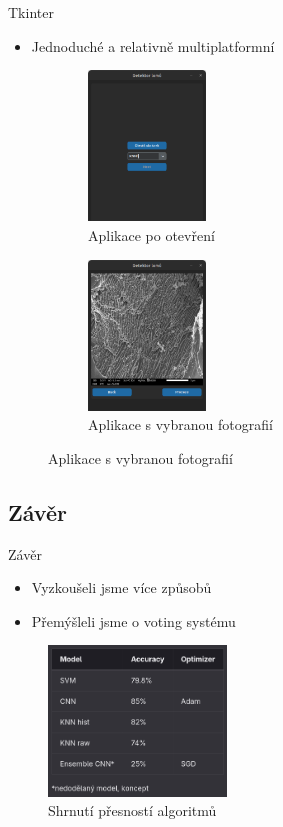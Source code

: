 \documentclass[aspectratio=169]{beamer}
\begin{document}
\begin{frame}{Tkinter}
    \begin{itemize}
        \item Jednoduché a relativně multiplatformní
    \end{itemize}
    \begin{figure}
        \centering
        \begin{subfigure}{.5\textwidth}
            \centering
            \includegraphics[height=4cm]{app_noimg.png}
            \caption{Aplikace po otevření}
            \label{fig:sub1}
        \end{subfigure}%
        \begin{subfigure}{.5\textwidth}
            \centering
            \includegraphics[height=4cm]{app_yesimg.png}
            \caption{Aplikace s vybranou fotografií}
            \label{fig:sub2}
        \end{subfigure}
    \end{figure}
\end{frame}

\subsection{Závěr}

\begin{frame}{Závěr}
    \begin{itemize}
        \item Vyzkoušeli jsme více způsobů
        \item Přemýšleli jsme o voting systému
    \end{itemize}
    \begin{figure}
        \centering
        \includegraphics[height=4cm]{table.png}
        \caption{Shrnutí přesností algoritmů}
    \end{figure}
\end{frame}
\end{document}
